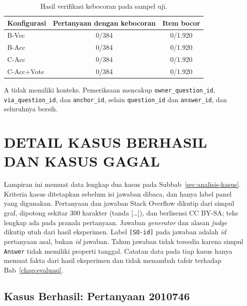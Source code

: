 \begin{table}[!htbp]
\centering
\small
\caption{Hasil verifikasi kebocoran pada sampel uji.}
\label{tab:lamp-bocor}
\renewcommand{\arraystretch}{1.2}
\begin{tabular}{|l|c|c|}
\hline
\textbf{Konfigurasi} & \textbf{Pertanyaan dengan kebocoran} & \textbf{Item bocor} \\
\hline
B-Vec & 0/384 & 0/1.920 \\
B-Acc & 0/384 & 0/1.920 \\
C-Acc & 0/384 & 0/1.920 \\
C-Acc+Vote & 0/384 & 0/1.920 \\
\hline
\end{tabular}
\end{table}

A tidak memiliki konteks. Pemeriksaan mencakup \texttt{owner\_\allowbreak{}question\_\allowbreak{}id}, \texttt{via\_\allowbreak{}question\_\allowbreak{}id}, dan \texttt{anchor\_id}, selain \texttt{question\_id} dan \texttt{answer\_id}, dan seluruhnya bersih. 



\cleardoublepage
\chapter{DETAIL KASUS BERHASIL DAN KASUS GAGAL}
\label{lamp:kasus}

Lampiran ini memuat data lengkap dua kasus pada Subbab~\ref{sec:analisis-kasus}. Kriteria kasus ditetapkan sebelum isi jawaban dibaca, dan hanya label panel yang digunakan. Pertanyaan dan jawaban Stack Overflow dikutip dari simpul graf, dipotong sekitar 300 karakter (tanda [\ldots]), dan berlisensi CC BY-SA; teks lengkap ada pada pranala pertanyaan. Jawaban \emph{generator} dan alasan \emph{judge} dikutip utuh dari hasil eksperimen. Label \texttt{[SO-id]} pada jawaban adalah \emph{id} pertanyaan asal, bukan \emph{id} jawaban. Tahun jawaban tidak tersedia karena simpul \texttt{Answer} tidak memiliki properti tanggal. Catatan data pada tiap kasus hanya memuat fakta dari hasil eksperimen dan tidak menambah tafsir terhadap Bab~\ref{chap:evaluasi}.

\section{Kasus Berhasil: Pertanyaan 2010746}
\label{sec:lamp-kasus-x}

